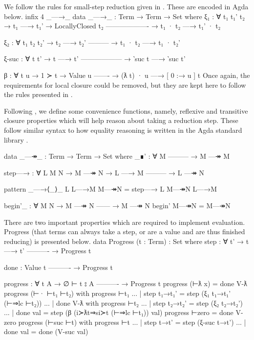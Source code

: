 \documentclass[logo,bsc,singlespacing,parskip,online]{infthesis}
\renewenvironment{code}{\mintedcopy[breaklines,breaksymbolleft=\;]{agda}}{\endmintedcopy}
\begin{document}
We follow the rules for small-step reduction given in \citet{chargueraud_locally_2012}. These are
encoded in Agda below.
\begin{code}
  infix 4 _—→_
  data _—→_ : Term → Term → Set where
    ξ₁ : ∀ {t₁ t₁' t₂}
      → t₁ —→ t₁'
      → LocallyClosed t₂
        -------------------
      → t₁ · t₂ —→ t₁' · t₂

    ξ₂ : ∀ {t₁ t₂ t₂'}
      → t₂ —→ t₂'
        ---------
      → t₁ · t₂ —→ t₁ · t₂'

    ξ-suc : ∀ {t t'}
      → t —→ t'
        ------------------
      → ‵suc t —→ ‵suc t'

    β : ∀ {t u}
      → 1 ≻ t
      → Value u
        -------
      → (ƛ t) · u —→ [ 0 :→ u ] t
\end{code}
Once again, the requirements for local closure could be removed, but they are kept here to follow
the rules presented in \citet{chargueraud_locally_2012}.

Following \citet{wadler_programming_2022}, we define some convenience functions, namely, reflexive
and transitive closure properties which will help reason about taking a reduction step. These follow
similar syntax to how equality reasoning is written in the Agda standard library
\citep{the_agda_community_agda_2024}.
\begin{comment}
\begin{code}
  infix  2 _—↠_
  infix  1 begin'_
  infixr 2 _—→⟨_⟩_
  infix  3 _∎'
\end{code}
\end{comment}
\begin{code}
  data _—↠_ : Term → Term → Set where
    _∎' : ∀ M
        ---------
      → M —↠ M

    step—→ : ∀ L {M N}
      → M —↠ N
      → L —→ M
        ---------
      → L —↠ N

  pattern _—→⟨_⟩_ L L—→M M—↠N = step—→ L M—↠N L—→M

  begin'_ : ∀ {M N}
    → M —↠ N
      ------
    → M —↠ N
  begin' M—↠N = M—↠N
\end{code}

There are two important properties which are required to implement evaluation. Progress (that terms
can always take a step, or are a value and are thus finished reducing) is presented below.
\begin{code}
  data Progress (t : Term) : Set where
    step : ∀ {t'}
      → t —→ t'
        ----------
      → Progress t

    done :
        Value t
        ----------
      → Progress t

  progress : ∀ {t A}
    → ∅ ⊢ t ⦂ A
      ----------
    → Progress t
  progress (⊢ƛ x) = done V-ƛ
  progress (⊢· ⊢t₁ ⊢t₂) with progress ⊢t₁
  ... | step t₁→t₁' = step (ξ₁ t₁→t₁' (⊢⇒lc ⊢t₂))
  ... | done V-ƛ with progress ⊢t₂
  ...   | step t₂→t₂' = step (ξ₂ t₂→t₂')
  ...   | done val    = step (β (i≻ƛt⇒si≻t (⊢⇒lc ⊢t₁)) val)
  progress ⊢zero = done V-zero
  progress (⊢suc ⊢t) with progress ⊢t
  ... | step t→t' = step (ξ-suc t→t')
  ... | done val  = done (V-suc val)
\end{code}
\end{document}
